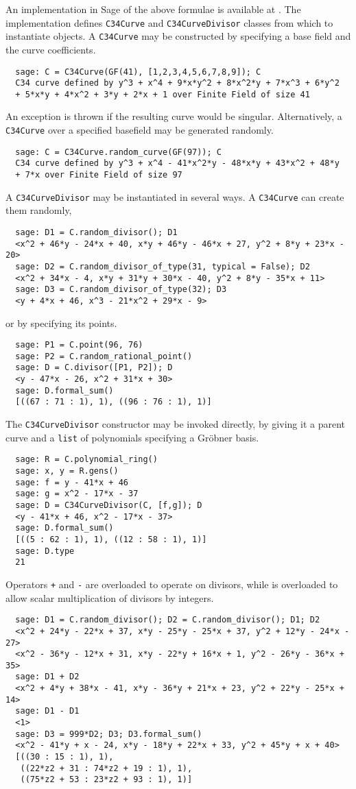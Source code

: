 An implementation in Sage of the above formulae is available at \cite{github}.
The implementation defines {\tt C34Curve} and {\tt C34CurveDivisor} classes from which to instantiate objects.
A {\tt C34Curve} may be constructed by specifying a base field and the curve coefficients.
\begin{verbatim}
  sage: C = C34Curve(GF(41), [1,2,3,4,5,6,7,8,9]); C
  C34 curve defined by y^3 + x^4 + 9*x*y^2 + 8*x^2*y + 7*x^3 + 6*y^2
  + 5*x*y + 4*x^2 + 3*y + 2*x + 1 over Finite Field of size 41
\end{verbatim}
An exception is thrown if the resulting curve would be singular.
Alternatively, a {\tt C34Curve} over a specified basefield may be generated randomly.
\begin{verbatim}
  sage: C = C34Curve.random_curve(GF(97)); C
  C34 curve defined by y^3 + x^4 - 41*x^2*y - 48*x*y + 43*x^2 + 48*y
  + 7*x over Finite Field of size 97
\end{verbatim}
A {\tt C34CurveDivisor} may be instantiated in several ways.
A {\tt C34Curve} can create them randomly,
\begin{verbatim}
  sage: D1 = C.random_divisor(); D1
  <x^2 + 46*y - 24*x + 40, x*y + 46*y - 46*x + 27, y^2 + 8*y + 23*x - 20>
  sage: D2 = C.random_divisor_of_type(31, typical = False); D2
  <x^2 + 34*x - 4, x*y + 31*y + 30*x - 40, y^2 + 8*y - 35*x + 11>
  sage: D3 = C.random_divisor_of_type(32); D3
  <y + 4*x + 46, x^3 - 21*x^2 + 29*x - 9>
\end{verbatim}
or by specifying its points.
\begin{verbatim}
  sage: P1 = C.point(96, 76)
  sage: P2 = C.random_rational_point()
  sage: D = C.divisor([P1, P2]); D
  <y - 47*x - 26, x^2 + 31*x + 30>
  sage: D.formal_sum()
  [((67 : 71 : 1), 1), ((96 : 76 : 1), 1)]
\end{verbatim}
The {\tt C34CurveDivisor} constructor may be invoked directly,
by giving it a parent curve and a {\tt list} of polynomials specifying a Gr\"obner basis.
\begin{verbatim}
  sage: R = C.polynomial_ring()
  sage: x, y = R.gens()
  sage: f = y - 41*x + 46
  sage: g = x^2 - 17*x - 37
  sage: D = C34CurveDivisor(C, [f,g]); D
  <y - 41*x + 46, x^2 - 17*x - 37>
  sage: D.formal_sum()
  [((5 : 62 : 1), 1), ((12 : 58 : 1), 1)]
  sage: D.type
  21
\end{verbatim}
Operators {\tt +} and {\tt -} are overloaded to operate on divisors,
while {\tt *} is overloaded to allow scalar multiplication of divisors by integers.
\begin{verbatim}
  sage: D1 = C.random_divisor(); D2 = C.random_divisor(); D1; D2
  <x^2 + 24*y - 22*x + 37, x*y - 25*y - 25*x + 37, y^2 + 12*y - 24*x - 27>
  <x^2 - 36*y - 12*x + 31, x*y - 22*y + 16*x + 1, y^2 - 26*y - 36*x + 35>
  sage: D1 + D2
  <x^2 + 4*y + 38*x - 41, x*y - 36*y + 21*x + 23, y^2 + 22*y - 25*x + 14>
  sage: D1 - D1
  <1>
  sage: D3 = 999*D2; D3; D3.formal_sum()
  <x^2 - 41*y + x - 24, x*y - 18*y + 22*x + 33, y^2 + 45*y + x + 40>
  [((30 : 15 : 1), 1),
   ((22*z2 + 31 : 74*z2 + 19 : 1), 1),
   ((75*z2 + 53 : 23*z2 + 93 : 1), 1)]
\end{verbatim}
